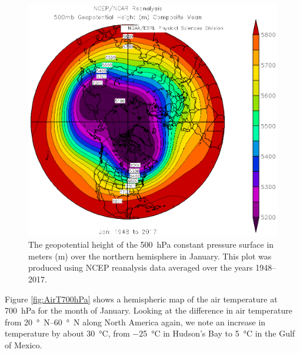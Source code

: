\documentclass[11pt]{article}
\begin{document}
\begin{figure}
	\centering
	\includegraphics[width=\textwidth]{GeoHeight500hPa.png}
	\caption{The geopotential height of the \SI{500}{\hecto\Pa} constant pressure surface in meters (m) over the northern hemisphere in January. This plot was produced using NCEP reanalysis data averaged over the years 1948--2017.}
	\label{fig:GeoHeight500hPa}
\end{figure}

Figure \ref{fig:AirT700hPa} shows a hemispheric map of the air temperature at \SI{700}{\hecto\Pa} for the month of January. Looking at the difference in air temperature from \SIrange{20}{60}{\degree N} along North America again, we note an increase in temperature by about \SI{30}{\degreeCelsius}, from \SI{-25}{\degreeCelsius} in Hudson's Bay to \SI{5}{\degreeCelsius} in the Gulf of Mexico.
\end{document}
